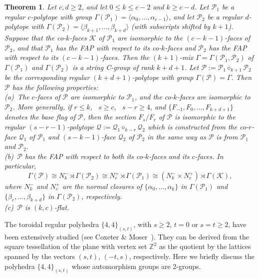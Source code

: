 \documentclass[10pt,a4paper]{amsart}
\newtheorem{theorem}{Theorem}[section]
\theoremstyle{definition}
\begin{document}
\begin{theorem}
\label{amalprops}
Let $c,d \geq 2$, and let $0 \leq k \leq c-2$ and $k \geq c-d$.  Let $\mathcal{P}_{1}$
be a regular $c$-polytope with group $\Gamma(\mathcal{P}_{1}) = \langle\alpha_{0},\ldots,\alpha_{c-1}\rangle$, and let $\mathcal{P}_{2}$ be a regular $d$-polytope with $\Gamma(\mathcal{P}_{2}) = \langle\beta_{k+1},\ldots,\beta_{k+d}\rangle$ (with subscripts shifted by $k+1$). Suppose that the co-$k$-faces $\mathcal{K}$ of $\mathcal{P}_{1}$ are isomorphic to the $(c-k-1)$-faces of $\mathcal{P}_{2}$, and that $\mathcal{P}_{1}$ has the FAP with respect to its co-$k$-faces and $\mathcal{P}_{2}$ has the FAP with respect to its $(c-k-1)$-faces. Then the $(k+1)$-mix $\Gamma = \Gamma(\mathcal{P}_{1},\mathcal{P}_{2})$ of $\Gamma(\mathcal{P}_{1})$ and $\Gamma(\mathcal{P}_{2})$ is a string C-group of rank $k+d+1$. Let $\mathcal{P} := \mathcal{P}_{1} \diamond_{k+1} \mathcal{P}_{2}$ be the corresponding regular $(k+d+1)$-polytope with group $\Gamma(\mathcal{P}) = \Gamma$. Then $\mathcal{P}$ has the following properties:\\[.02in]
(a)\, The $c$-faces of $\mathcal{P}$ are isomorphic to $\mathcal{P}_{1}$, and the
co-$k$-faces are isomorphic to $\mathcal{P}_{2}$.  More generally, if $r \leq k$, \ 
$s \geq c$, \ $s-r \geq 4$, and $\{F_{-1},F_0,\ldots,F_{k+d+1}\}$ denotes the base flag of $\mathcal{P}$, then the section $F_{s}/F_{r}$ of $\mathcal{P}$ is
isomorphic to the regular $(s-r-1)$-polytope $\mathcal{Q} := \mathcal{Q}_{1} \diamond_{k-r}\mathcal{Q}_{2}$ which is constructed from the co-$r$-face $\mathcal{Q}_{1}$ of $\mathcal{P}_{1}$ and $(s-k-1)$-face $\mathcal{Q}_{2}$ of $\mathcal{P}_{2}$ in the same way as $\mathcal{P}$ is from $\mathcal{P}_{1}$ and $\mathcal{P}_{2}$.\\[.02in]
(b)\, $\mathcal{P}$ has the FAP with respect to both its co-$k$-faces and its
$c$-faces.  In particular,
\[  \Gamma(\mathcal{P}) \cong 
N_{k}^{-} \rtimes \Gamma(\mathcal{P}_{2}) \cong
N_{c}^{+} \rtimes \Gamma(\mathcal{P}_{1}) \cong 
(N_{k}^{-} \times N_{c}^{+}) \rtimes \Gamma(\mathcal{K}),  \]
where $N_{k}^{-}$ and $N_{c}^{+}$ are the normal closures of 
$\{\alpha_{0},\ldots,\alpha_{k}\}$ in $\Gamma(\mathcal{P}_{1})$ and 
$\{\beta_{c},\ldots,\beta_{k+d}\}$ in $\Gamma(\mathcal{P}_{2})$, respectively.\\[.02in]
(c)\, $\mathcal{P}$ is $(k,c)$-flat.
\end{theorem}

The toroidal regular polyhedra $\{4,4\}_{(s,t)}$, with $s\geq 2$, $t=0$ or $s=t\geq 2$, have been extensively studied (see Coxeter \& Moser~\cite[Ch. 8]{CoxMos1980}). 
They can be derived from the square tessellation of the plane with vertex set $\mathbb{Z}^2$ as the quotient by the lattices spanned by the vectors $(s,t)$, $(-t,s)$, respectively. Here we briefly discuss the polyhedra $\{4,4\}_{(s,t)}$ whose automorphism groups are 2-groups.
\end{document}
